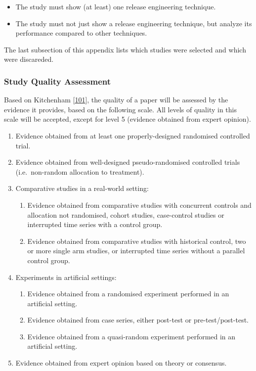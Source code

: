 \documentclass[]{book}
\providecommand{\tightlist}{%
  \setlength{\itemsep}{0pt}\setlength{\parskip}{0pt}}
\begin{document}
\begin{itemize}
\tightlist
\item
  The study must show (at least) one release engineering technique.
\item
  The study must not just show a release engineering technique, but
  analyze its performance compared to other techniques.
\end{itemize}

The last subsection of this appendix lists which studies were selected
and which were discareded.

\subsubsection{Study Quality Assessment}\label{study-quality-assessment}

Based on Kitchenham
{[}\protect\hyperlink{ref-kitchenham2004procedures}{101}{]}, the quality
of a paper will be assessed by the evidence it provides, based on the
following scale. All levels of quality in this scale will be accepted,
except for level 5 (evidence obtained from expert opinion).

\begin{enumerate}
\def\labelenumi{\arabic{enumi}.}
\tightlist
\item
  Evidence obtained from at least one properly-designed randomised
  controlled trial.
\item
  Evidence obtained from well-designed pseudo-randomised controlled
  trials (i.e.~non-random allocation to treatment).
\item
  Comparative studies in a real-world setting:

  \begin{enumerate}
  \def\labelenumii{\arabic{enumii}.}
  \tightlist
  \item
    Evidence obtained from comparative studies with concurrent controls
    and allocation not randomised, cohort studies, case-control studies
    or interrupted time series with a control group.
  \item
    Evidence obtained from comparative studies with historical control,
    two or more single arm studies, or interrupted time series without a
    parallel control group.
  \end{enumerate}
\item
  Experiments in artificial settings:

  \begin{enumerate}
  \def\labelenumii{\arabic{enumii}.}
  \tightlist
  \item
    Evidence obtained from a randomised experiment performed in an
    artificial setting.
  \item
    Evidence obtained from case series, either post-test or
    pre-test/post-test.
  \item
    Evidence obtained from a quasi-random experiment performed in an
    artificial setting.
  \end{enumerate}
\item
  Evidence obtained from expert opinion based on theory or consensus.
\end{enumerate}
\end{document}
